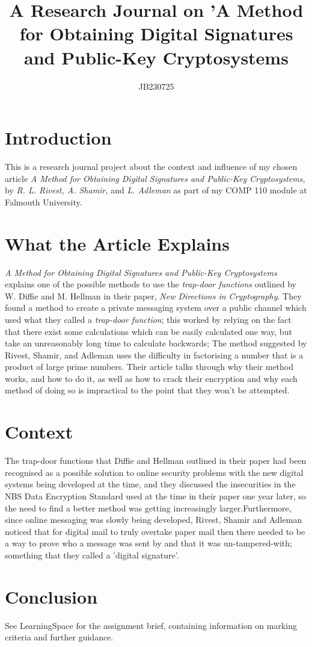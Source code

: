 \documentclass{article}
\title{A Research Journal on 'A Method for Obtaining Digital Signatures and Public-Key Cryptosystems}
\author{JB230725}
\begin{document}
\maketitle

\section{Introduction}

This is a research journal project about the context and influence of my chosen article \textit{A Method for Obtaining Digital Signatures and Public-Key Cryptosystems}, by \textit{R. L. Rivest, A. Shamir,} and \textit{L. Adleman} \cite{rivest1978_rsa} as part of my COMP 110 module at Falmouth University.

\section{What the Article Explains}

\textit{A Method for Obtaining Digital Signatures and Public-Key Cryptosystems} explains one of the possible methods to use the \textit{trap-door functions} outlined by W. Diffie and M. Hellman in their paper, \textit{New Directions in Cryptography}\cite{diffie1976new}. They found a method to create a private messaging system over a public channel which used what they called a \textit{trap-door function}; this worked by relying on the fact that there exist some calculations which can be easily calculated one way, but take an unreasonably long time to calculate backwards; The method suggested by Rivest, Shamir, and Adleman uses the difficulty in factorising a number that is a product of large prime numbers. \newline
Their article talks through why their method works, and how to do it, as well as how to crack their encryption and why each method of doing so is impractical to the point that they won't be attempted.

\section{Context}

The trap-door functions that Diffie and Hellman outlined in their paper\cite{diffie1976new} had been recognised as a possible solution to online security problems with the new digital systems being developed at the time, and they discussed the insecurities in the NBS Data Encryption Standard used at the time in their paper one year later\cite{diffie1977special}, so the need to find a better method was getting increasingly larger.\newline Furthermore, since online messaging was slowly being developed, Rivest, Shamir and Adleman noticed that for digital mail to truly overtake paper mail then there needed to be a way to prove who a message was sent by and that it was un-tampered-with; something that they called a 'digital signature'.

\section{Conclusion}

See LearningSpace for the assignment brief, containing information on marking criteria and further guidance.



\end{document}
